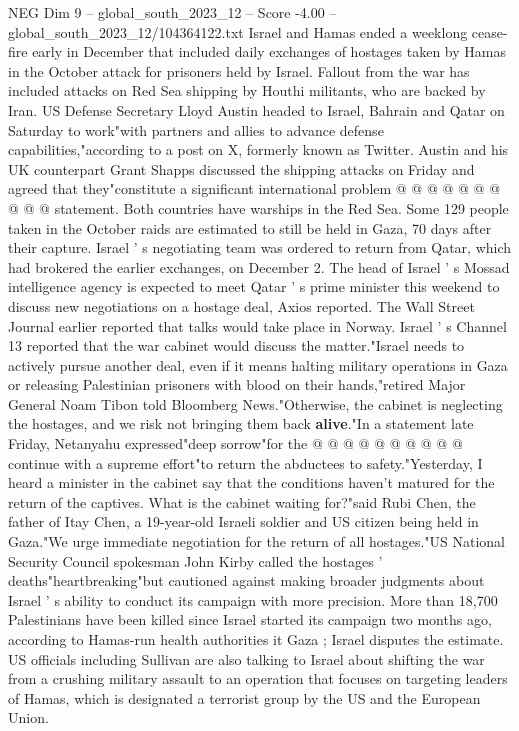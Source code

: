 \begin{textsample}{NEG Dim 9 – global\_south\_2023\_12 – Score -4.00 – global\_south\_2023\_12/104364122.txt}
Israel and Hamas ended a weeklong cease-fire early in December that included daily exchanges of hostages taken by Hamas in the October attack for prisoners held by Israel.
Fallout from the war has included attacks on Red Sea shipping by Houthi militants, who are backed by Iran.
US Defense Secretary Lloyd Austin headed to Israel, Bahrain and Qatar on Saturday to work"with partners and allies to advance defense capabilities,"according to a post on X, formerly known as Twitter.
Austin and his UK counterpart Grant Shapps discussed the shipping attacks on Friday and agreed that they"constitute a significant international problem @ @ @ @ @ @ @ @ @ @ statement.
Both countries have warships in the Red Sea.
Some 129 people taken in the October raids are estimated to still be held in Gaza, 70 days after their capture.
Israel ' s negotiating team was ordered to return from Qatar, which had brokered the earlier exchanges, on December 2.
The head of Israel ' s Mossad intelligence agency is expected to meet Qatar ' s prime minister this weekend to discuss new negotiations on a hostage deal, Axios reported.
The Wall Street Journal earlier reported that talks would take place in Norway.
Israel ' s Channel 13 reported that the war cabinet would discuss the matter."Israel needs to actively pursue another deal, even if it means halting military operations in Gaza or releasing Palestinian prisoners with blood on their hands,"retired Major General Noam Tibon told Bloomberg News."Otherwise, the cabinet is neglecting the hostages, and we risk not bringing them back \textbf{alive}."In a statement late Friday, Netanyahu expressed"deep sorrow"for the @ @ @ @ @ @ @ @ @ @ continue with a supreme effort"to return the abductees to safety."Yesterday, I heard a minister in the cabinet say that the conditions haven't matured for the return of the captives.
What is the cabinet waiting for?"said Rubi Chen, the father of Itay Chen, a 19-year-old Israeli soldier and US citizen being held in Gaza."We urge immediate negotiation for the return of all hostages."US National Security Council spokesman John Kirby called the hostages ' deaths"heartbreaking"but cautioned against making broader judgments about Israel ' s ability to conduct its campaign with more precision.
More than 18,700 Palestinians have been killed since Israel started its campaign two months ago, according to Hamas-run health authorities it Gaza ; Israel disputes the estimate.
US officials including Sullivan are also talking to Israel about shifting the war from a crushing military assault to an operation that focuses on targeting leaders of Hamas, which is designated a terrorist group by the US and the European Union.

\end{textsample}

